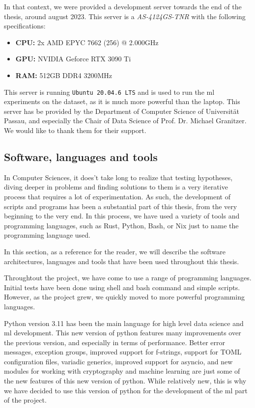     In that context, we were provided a development server towards the end of the thesis, around august 2023. This server is a \textit{AS-4124GS-TNR} with the following specifications:

    \begin{itemize}
        \item \textbf{CPU:} 2x AMD EPYC 7662 (256) @ 2.000GHz
        \item \textbf{GPU:} NVIDIA Geforce RTX 3090 Ti
        \item \textbf{RAM:} 512GB DDR4 3200MHz
    \end{itemize}

    This server is running \texttt{Ubuntu 20.04.6 LTS} and is used to run the \acrshort{ml} experiments on the dataset, as it is much more powerful than the laptop. This server has be provided by the Department of Computer Science of Universität Passau, and especially the Chair of Data Science of Prof. Dr. Michael Granitzer. We would like to thank them for their support.

    \subsection{Software, languages and tools}
    In Computer Sciences, it does't take long to realize that testing hypotheses, diving deeper in problems and finding solutions to them is a very iterative process that requires a lot of experimentation. As such, the development of scripts and programs has been a substantial part of this thesis, from the very beginning to the very end. In this process, we have used a variety of tools and programming languages, such as Rust, Python, Bash, or Nix just to name the programming language used.

    In this section, as a reference for the reader, we will describe the software architectures, languages and tools that have been used throughout this thesis.

    Throughtout the project, we have come to use a range of programming languages. Initial tests have been done using shell and bash command and simple scripts. However, as the project grew, we quickly moved to more powerful programming languages. 

    Python version 3.11 has been the main language for high level data science and \acrshort{ml} development. This new version of python features many improvements over the previous version, and especially in terms of performance. Better error messages, exception groups, improved support for f-strings, support for TOML configuration files, variadic generics, improved support for asyncio, and new modules for working with cryptography and machine learning are just some of the new features of this new version of python. While relatively new, this is why we have decided to use this version of python for the development of the \acrshort{ml} part of the project.

